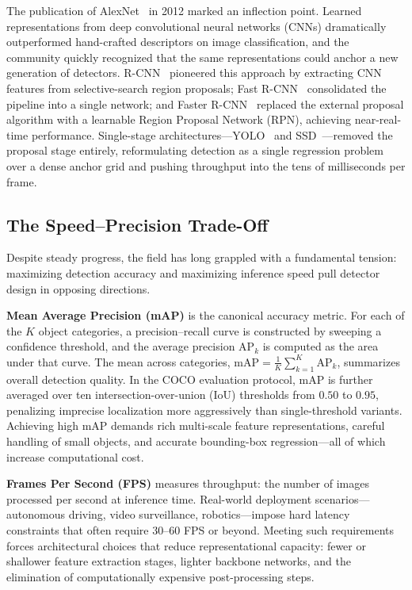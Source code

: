 The publication of AlexNet~\cite{krizhevsky2012imagenet} in
2012 marked an inflection point.  Learned representations from
deep convolutional neural networks (CNNs) dramatically
outperformed hand-crafted descriptors on image classification,
and the community quickly recognized that the same
representations could anchor a new generation of detectors.
R-CNN~\cite{girshick2014rich} pioneered this approach by
extracting CNN features from selective-search region proposals;
Fast R-CNN~\cite{girshick2015fast} consolidated the pipeline
into a single network; and Faster R-CNN~\cite{ren2015faster}
replaced the external proposal algorithm with a learnable
Region Proposal Network (RPN), achieving near-real-time
performance.  Single-stage architectures---YOLO~\cite{redmon2016you}
and SSD~\cite{liu2016ssd}---removed the proposal stage
entirely, reformulating detection as a single regression
problem over a dense anchor grid and pushing throughput into
the tens of milliseconds per frame.

\subsection{The Speed--Precision Trade-Off}

Despite steady progress, the field has long grappled with a
fundamental tension: maximizing detection accuracy and
maximizing inference speed pull detector design in opposing
directions.

\textbf{Mean Average Precision (mAP)} is the canonical accuracy
metric.  For each of the $K$ object categories, a
precision--recall curve is constructed by sweeping a confidence
threshold, and the average precision $\text{AP}_k$ is computed
as the area under that curve.  The mean across categories,
$\text{mAP} = \frac{1}{K}\sum_{k=1}^{K}\text{AP}_k$,
summarizes overall detection quality.  In the COCO evaluation
protocol, mAP is further averaged over ten intersection-over-union
(IoU) thresholds from $0.50$ to $0.95$, penalizing imprecise
localization more aggressively than single-threshold variants.
Achieving high mAP demands rich multi-scale feature
representations, careful handling of small objects, and
accurate bounding-box regression---all of which increase
computational cost.

\textbf{Frames Per Second (FPS)} measures throughput: the
number of images processed per second at inference time.
Real-world deployment scenarios---autonomous driving,
video surveillance, robotics---impose hard latency constraints
that often require 30--60 FPS or beyond.  Meeting such
requirements forces architectural choices that reduce
representational capacity: fewer or shallower feature
extraction stages, lighter backbone networks, and the
elimination of computationally expensive post-processing steps.

